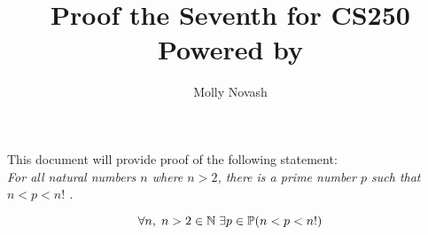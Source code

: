 \documentclass[12pt]{article}
\author{Molly Novash}
\title{%
\Huge Proof the Seventh for CS250  \\
\normalsize Powered by \LaTeXe}
\begin{document}
\sloppy
\maketitle
\bigskip

This document will provide proof of the following statement: \\

\textit{For all natural numbers $n$ where $n > 2$, there is a prime number $p$ such that $n < p < n!$ \hspace{.1cm}.}
\bigskip

\begin{equation}
\forall n, \hspace{.1cm} n > 2 \in \mathbb{N}\hspace{.1cm}\exists p \in \mathbb{P}(n < p < n!)
\end{equation}
\bigskip
\end{document}
